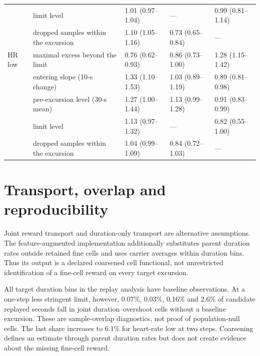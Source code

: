 \documentclass[11pt,letterpaper]{article}
\begin{document}
\begin{table}[htbp]
\begin{tabular}{@{}lllll@{}}
 & limit level & 1.01 (0.97--1.04) & --- & 0.99 (0.81--1.14) \\
 & dropped samples within the excursion & 1.10 (1.05--1.16) & 0.73 (0.65--0.84) & --- \\
\addlinespace
HR low & maximal excess beyond the limit & 0.76 (0.62--0.93) & 0.86 (0.73--1.00) & 1.28 (1.15--1.42) \\
 & entering slope (10-s change) & 1.33 (1.10--1.53) & 1.03 (0.89--1.19) & 0.89 (0.81--0.98) \\
 & pre-excursion level (30-s mean) & 1.27 (1.00--1.44) & 1.13 (0.99--1.28) & 0.91 (0.83--0.99) \\
 & limit level & 1.13 (0.97--1.32) & --- & 0.82 (0.55--1.00) \\
 & dropped samples within the excursion & 1.04 (0.99--1.09) & 0.84 (0.72--1.03) & --- \\
\bottomrule
\end{tabular}
\end{table}



\section{Transport, overlap and reproducibility}\label{s:transport}

Joint reward transport and duration-only transport are alternative assumptions. The feature-augmented implementation additionally substitutes parent duration rates outside retained fine cells and uses carrier averages within duration bins. Thus its output is a declared coarsened cell functional, not unrestricted identification of a fine-cell reward on every target excursion.

All target duration bins in the replay analysis have baseline observations. At a one-step less stringent limit, however, 0.07\%, 0.03\%, 0.16\% and 2.6\% of candidate replayed seconds fall in joint duration--overshoot cells without a baseline excursion. These are sample-overlap diagnostics, not proof of population-null cells. The last share increases to 6.1\% for heart-rate low at two steps. Coarsening defines an estimate through parent duration rates but does not create evidence about the missing fine-cell reward.

\end{document}
